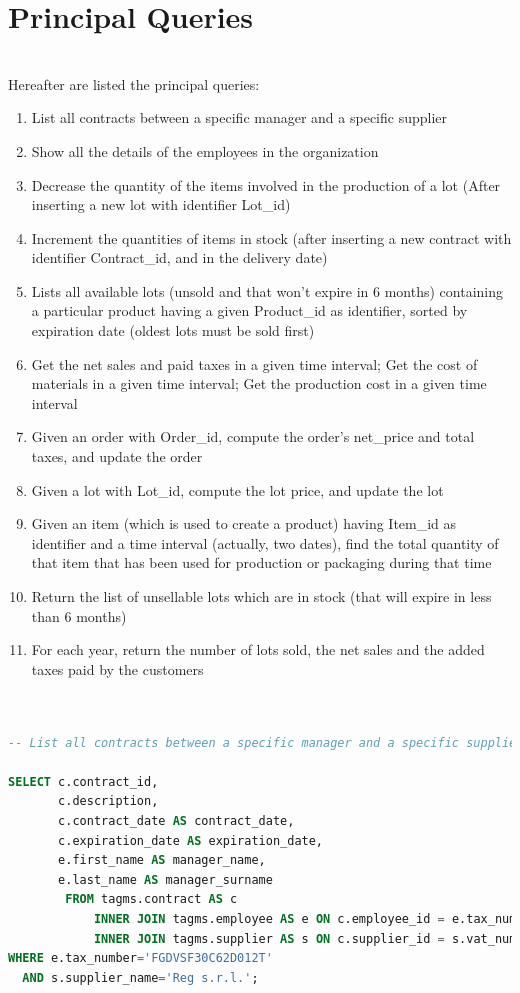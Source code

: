 \section{Principal Queries}
\\
Hereafter are listed the principal queries:
\begin{enumerate}
    \item List all contracts between a specific manager and a specific supplier
    \item Show all the details of the employees in the organization
    \item Decrease the quantity of the items involved in the production of a lot (After inserting a new lot with identifier Lot\_id)
    \item Increment the quantities of items in stock (after inserting a new contract with identifier Contract\_id, and in the delivery date)
    \item Lists all available lots (unsold and that won't expire in 6 months) containing a particular product having a given Product\_id as identifier, sorted by expiration date (oldest lots must be sold first)
    \item Get the net sales and paid taxes in a given time interval; Get the cost of materials in a given time interval; Get the production cost in a given time interval
    \item Given an order with Order\_id, compute the order's net\_price and total taxes, and update the order
    \item Given a lot with Lot\_id, compute the lot price, and update the lot
    \item Given an item (which is used to create a product) having Item\_id as identifier and a time interval (actually, two dates), find the total quantity of that item that has been used for production or packaging during that time
    \item Return the list of unsellable lots which are in stock (that will expire in less than 6 months)
    \item For each year, return the number of lots sold, the net sales and the added taxes paid by the customers
\end{enumerate}

\begin{lstlisting}[language=SQL,
keywordstyle=\color{blue},
stringstyle=\color{mauve},
showstringspaces=false,
breaklines=true,
basicstyle=\ttfamily\footnotesize]


-- List all contracts between a specific manager and a specific supplier.

SELECT c.contract_id,
       c.description,
       c.contract_date AS contract_date,
       c.expiration_date AS expiration_date,
       e.first_name AS manager_name,
       e.last_name AS manager_surname
		FROM tagms.contract AS c
		    INNER JOIN tagms.employee AS e ON c.employee_id = e.tax_number
		    INNER JOIN tagms.supplier AS s ON c.supplier_id = s.vat_number
WHERE e.tax_number='FGDVSF30C62D012T'
  AND s.supplier_name='Reg s.r.l.';
  
\end{lstlisting}

